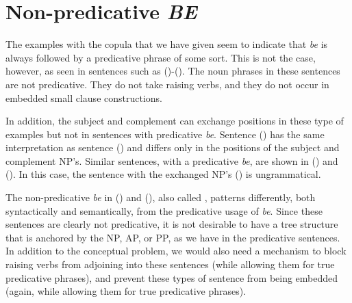 \section{Non-predicative {\it BE}}
\label{equative-be-xtag-analysis}

The examples with the copula that we have given seem to indicate that {\it be}
is always followed by a predicative phrase of some sort.  This is not the case,
however, as seen in sentences such as ({})-({}).  The noun phrases in
these sentences are not predicative.  They do not take raising verbs, and they
do not occur in embedded small clause constructions.




In addition, the subject and complement can exchange positions in these type of
examples but not in sentences with predicative {\it be}.  Sentence ({})
has the same interpretation as sentence ({}) and differs only in the
positions of the subject and complement NP's. Similar sentences, with a
predicative {\it be}, are shown in ({}) and ({}).  In this case,
the sentence with the exchanged NP's ({}) is ungrammatical.


The non-predicative {\it be} in ({}) and ({}), also called
, patterns differently, both syntactically and
semantically, from the predicative usage of {\it be}.  Since these sentences
are clearly not predicative, it is not desirable to have a tree structure that
is anchored by the NP, AP, or PP, as we have in the predicative sentences.  In
addition to the conceptual problem, we would also need a mechanism to block
raising verbs from adjoining into these sentences (while allowing them for true
predicative phrases), and prevent these types of sentence from being embedded
(again, while allowing them for true predicative phrases).  

